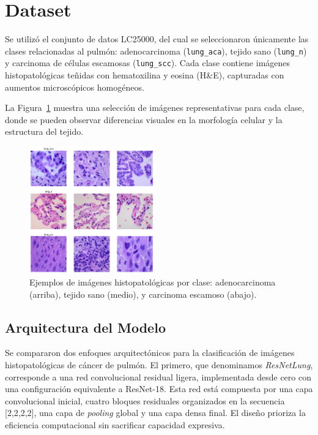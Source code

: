 \documentclass[conference]{IEEEtran}
\begin{document}
\section{Dataset}

Se utilizó el conjunto de datos LC25000, del cual se seleccionaron únicamente las clases relacionadas al pulmón: adenocarcinoma (\texttt{lung\_aca}), tejido sano (\texttt{lung\_n}) y carcinoma de células escamosas (\texttt{lung\_scc}). Cada clase contiene imágenes histopatológicas teñidas con hematoxilina y eosina (H\&E), capturadas con aumentos microscópicos homogéneos.

La Figura~\ref{fig:dataset} muestra una selección de imágenes representativas para cada clase, donde se pueden observar diferencias visuales en la morfología celular y la estructura del tejido.

\begin{figure}[H]
\centering
\includegraphics[width=0.48\textwidth]{figs/dataset_exploration.png}
\caption{Ejemplos de imágenes histopatológicas por clase: adenocarcinoma (arriba), tejido sano (medio), y carcinoma escamoso (abajo).}
\label{fig:dataset}
\end{figure}

\subsection{Arquitectura del Modelo}

Se compararon dos enfoques arquitectónicos para la clasificación de imágenes histopatológicas de cáncer de pulmón. El primero, que denominamos \textit{ResNetLung}, corresponde a una red convolucional residual ligera, implementada desde cero con una configuración equivalente a ResNet-18. Esta red está compuesta por una capa convolucional inicial, cuatro bloques residuales organizados en la secuencia [2,2,2,2], una capa de \textit{pooling} global y una capa densa final. El diseño prioriza la eficiencia computacional sin sacrificar capacidad expresiva.
\end{document}
